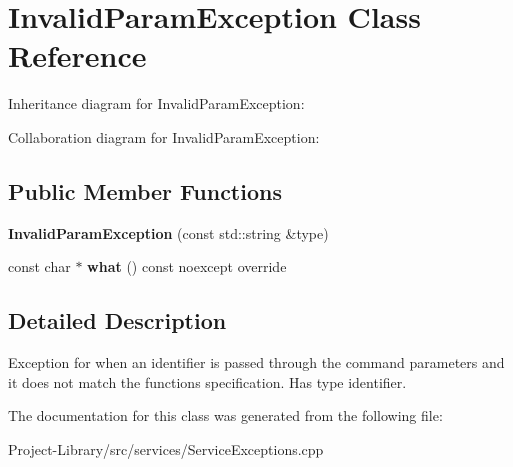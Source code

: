 \hypertarget{classInvalidParamException}{}\section{Invalid\+Param\+Exception Class Reference}
\label{classInvalidParamException}


Inheritance diagram for Invalid\+Param\+Exception\+:


Collaboration diagram for Invalid\+Param\+Exception\+:
\subsection*{Public Member Functions}
\begin{DoxyCompactItemize}
\item 
\mbox{\label{classInvalidParamException_a6b6b875df1279244b69e2ca846eba7d4}} 
{\bfseries Invalid\+Param\+Exception} (const std\+::string \&type)
\item 
\mbox{\label{classInvalidParamException_a247d28923f8e1c186be37b198f3eda72}} 
const char $\ast$ {\bfseries what} () const noexcept override
\end{DoxyCompactItemize}


\subsection{Detailed Description}
Exception for when an identifier is passed through the command parameters and it does not match the function\textquotesingle{}s specification. Has type identifier. 

The documentation for this class was generated from the following file\+:\begin{DoxyCompactItemize}
\item 
Project-\/\+Library/src/services/Service\+Exceptions.\+cpp\end{DoxyCompactItemize}
